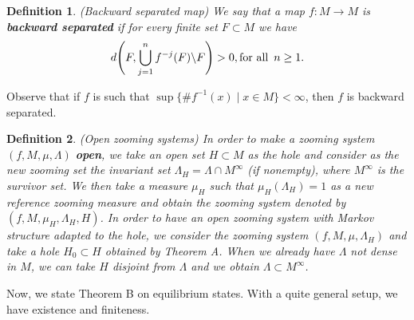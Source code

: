\documentclass[12pt,a4paper]{amsart}
\theoremstyle{plain}
\newtheorem{definition}{Definition}[subsection]
\begin{document}
\begin{definition}
	(Backward separated map) We say that a map $f:M \to M$ is \textbf{\textit{backward separated}} if for every finite set $F \subset M$ we have
	\[
	\displaystyle d\Bigg{(}F, \bigcup_{j=1}^{n} f^{-j}(F) \backslash F \Bigg{)} > 0, \text{for all} \, \,\, n \geq 1.
	\]
\end{definition}
Observe that if $f$ is such that $\sup\{\# f^{-1} (x) \mid x \in M \}< \infty$, then $f$ is backward separated.


\begin{definition}(Open zooming systems) \label{open zooming}
	In order to make a zooming system $(f,M,\mu,\Lambda)$ \textbf{\textit{open}}, we take an open set $H \subset M$ as the hole and consider as the new zooming set the invariant set $\Lambda_{H} = \Lambda \cap M^{\infty}$ (if nonempty), where $M^{\infty}$ is the survivor set. We then take a measure $\mu_{H}$ such that $\mu_{H}(\Lambda_{H}) = 1$ as a new reference zooming measure and obtain the zooming system denoted by $(f,M,\mu_{H}, \Lambda_{H}, H)$. In order to have an open zooming system with Markov structure adapted to the hole, we consider the zooming system $(f,M,\mu,\Lambda_{H})$ and take a hole $H_{0} \subset H$ obtained by \cite{S}{Theorem A}. When we already have $\Lambda$ not dense in $M$, we can take $H$ disjoint from $\Lambda$ and we obtain $\Lambda \subset M^{\infty}$.
\end{definition}

Now, we state \cite{S}{Theorem B} on equilibrium states. With a quite general setup, we have existence and finiteness.
\end{document}
